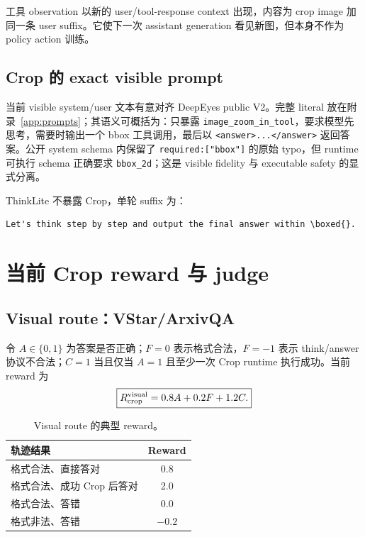 \documentclass[UTF8,twocolumn,10pt,a4paper]{ctexart}
\newcommand{\code}[1]{\texttt{#1}}
\newcommand{\Rcrop}{R_{\mathrm{crop}}}
\begin{document}
工具 observation 以新的 user/tool-response context 出现，内容为 crop image 加同一条 user suffix。它使下一次 assistant generation 看见新图，但本身不作为 policy action 训练。

\subsection{Crop 的 exact visible prompt}

当前 visible system/user 文本有意对齐 DeepEyes public V2。完整 literal 放在附录~\ref{app:prompts}；其语义可概括为：只暴露 \code{image\_zoom\_in\_tool}，要求模型先思考，需要时输出一个 bbox 工具调用，最后以 \code{<answer>...</answer>} 返回答案。公开 system schema 内保留了 \code{required:["bbox"]} 的原始 typo，但 runtime 可执行 schema 正确要求 \code{bbox\_2d}；这是 visible fidelity 与 executable safety 的显式分离。

ThinkLite 不暴露 Crop，单轮 suffix 为：
\begin{Verbatim}[breaklines=true,breakanywhere=true,fontsize=\scriptsize]
Let's think step by step and output the final answer within \boxed{}.
\end{Verbatim}

\section{当前 Crop reward 与 judge}

\subsection{Visual route：VStar/ArxivQA}

令 $A\in\{0,1\}$ 为答案是否正确；$F=0$ 表示格式合法，$F=-1$ 表示 think/answer 协议不合法；$C=1$ 当且仅当 $A=1$ 且至少一次 Crop runtime 执行成功。当前 reward 为
\begin{equation}
\boxed{\Rcrop^{\rm visual}=0.8A+0.2F+1.2C.}
\label{eq:crop-visual}
\end{equation}

\begin{table}[t]
\centering
\caption{Visual route 的典型 reward。}
\label{tab:crop-reward}
\small
\begin{tabularx}{\columnwidth}{Yc}
\toprule
轨迹结果 & Reward \\
\midrule
格式合法、直接答对 & 0.8 \\
格式合法、成功 Crop 后答对 & 2.0 \\
格式合法、答错 & 0.0 \\
格式非法、答错 & $-0.2$ \\
\bottomrule
\end{tabularx}
\end{table}
\end{document}
